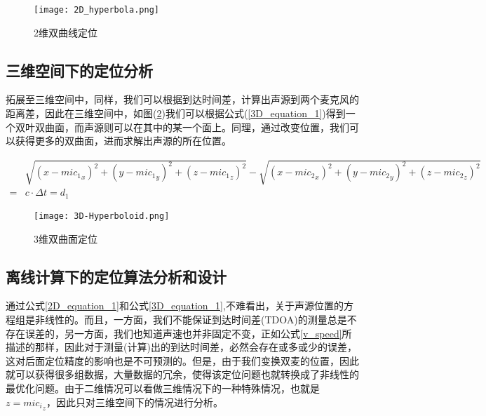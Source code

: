 \documentclass[winfonts,oneside]{njuthesis}
\begin{document}
		\begin{figure}[H]
			\centering
			\texttt{[image: 2D\_hyperbola.png]} 
			\caption{2维双曲线定位}
			\label{fig: 2D_hyperbola}
		\end{figure}		
		
		\subsection{三维空间下的定位分析}
		
		拓展至三维空间中，同样，我们可以根据到达时间差，计算出声源到两个麦克风的距离差，因此在三维空间中，如图(\ref{fig: 3D-Hyperboloid})我们可以根据公式(\ref{3D_equation_1})得到一个双叶双曲面，而声源则可以在其中的某一个面上。同理，通过改变位置，我们可以获得更多的双曲面，进而求解出声源的所在位置。
		
		\begin{equation}
		\begin{aligned}
			&\sqrt{(x-{mic_1}_x)^2+(y-{mic_1}_y)^2+(z-{mic_1}_z)^2} - \sqrt{(x-{mic_2}_x)^2+(y-{mic_2}_y)^2+(z-{mic_2}_z)^2}\\
		  = & c \cdot \Delta t= d_1 \label{3D_equation_1}
		\end{aligned}
		\end{equation}
		
		\begin{figure}[H]
			\centering
			\texttt{[image: 3D-Hyperboloid.png]} 
			\caption{3维双曲面定位}
			\label{fig: 3D-Hyperboloid}
		\end{figure}	
		
		\subsection{离线计算下的定位算法分析和设计}
		
		通过公式\ref{2D_equation_1}和公式\ref{3D_equation_1},不难看出，关于声源位置的方程组是非线性的。而且，一方面，我们不能保证到达时间差(TDOA)的测量总是不存在误差的，另一方面，我们也知道声速也并非固定不变，正如公式\ref{v_speed}所描述的那样，因此对于测量(计算)出的到达时间差，必然会存在或多或少的误差，这对后面定位精度的影响也是不可预测的。但是，由于我们变换双麦的位置，因此就可以获得很多组数据，大量数据的冗余，使得该定位问题也就转换成了非线性的最优化问题。由于二维情况可以看做三维情况下的一种特殊情况，也就是$z = {mic_i}_z$，因此只对三维空间下的情况进行分析。
		
\end{document}
